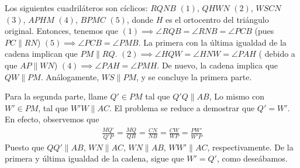 \begin{sol}
	Los siguientes cuadril\'ateros son c\'iclicos: $RQNB$ $(1)$, $QHWN$  $(2)$, $WSCN$ $(3)$, $APHM$ $(4)$, $BPMC$ $(5)$, donde $H$ es el ortocentro del tri\'angulo original. Entonces, tenemos que $(1) \implies \angle RQB = \angle RNB = \angle PCB$ (pues $PC \parallel RN$) $(5) \implies \angle PCB = \angle PMB$. La primera con la \'ultima igualdad de la cadena implican que $PM \parallel RQ$. $(2) \implies \angle HQW = \angle HNW = \angle PAH$ ( debido a que $AP \parallel WN$) $(4) \implies \angle PAH = \angle PMH$. De nuevo, la cadena implica que $QW \parallel PM$. An\'alogamente, $WS \parallel PM$, y se concluye la primera parte.
	
	Para la segunda parte, llame $Q' \in PM$ tal que $Q'Q \parallel AB$, Lo mismo con $W' \in PM$, tal que $W'W \parallel AC$. El problema se reduce a demostrar que $Q' = W'$. En efecto, observemos que 
	\begin{align}
	\frac{MQ'}{Q'P} = \frac{MQ}{QB} = \frac{CN}{NB} = \frac{CW}{WP} = \frac{PW'}{W'P}
	\end{align}
	Puesto que $QQ' \parallel AB$, $WN \parallel AC$, $WN \parallel AB$, $WW' \parallel AC$, respectivamente. De la primera y \'ultima igualdad de la cadena, sigue que $W' = Q'$, como dese\'abamos. 
\end{sol}


